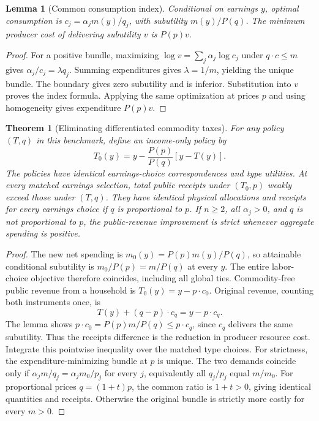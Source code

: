 \documentclass[11pt]{article}
\newtheorem{theorem}{Theorem}
\newtheorem{lemma}{Lemma}
\theoremstyle{definition}
\begin{document}
\begin{lemma}[Common consumption index]
Conditional on earnings $y$, optimal consumption is $c_j=\alpha_jm(y)/q_j$, with subutility $m(y)/P(q)$. The minimum producer cost of delivering subutility $v$ is $P(p)v$.
\end{lemma}
\begin{proof}
For a positive bundle, maximizing $\log v=\sum_j\alpha_j\log c_j$ under $q\cdot c\leq m$ gives $\alpha_j/c_j=\lambda q_j$. Summing expenditures gives $\lambda=1/m$, yielding the unique bundle. The boundary gives zero subutility and is inferior. Substitution into $v$ proves the index formula. Applying the same optimization at prices $p$ and using homogeneity gives expenditure $P(p)v$.
\end{proof}

\begin{theorem}[Eliminating differentiated commodity taxes]
For any policy $(T,q)$ in this benchmark, define an income-only policy by
\[
 T_0(y)=y-\frac{P(p)}{P(q)}[y-T(y)].
\]
The policies have identical earnings-choice correspondences and type utilities. At every matched earnings selection, total public receipts under $(T_0,p)$ weakly exceed those under $(T,q)$. They have identical physical allocations and receipts for every earnings choice if $q$ is proportional to $p$. If $n\geq2$, all $\alpha_j>0$, and $q$ is not proportional to $p$, the public-revenue improvement is strict whenever aggregate spending is positive.
\end{theorem}
\begin{proof}
The new net spending is $m_0(y)=P(p)m(y)/P(q)$, so attainable conditional subutility is $m_0/P(p)=m/P(q)$ at every $y$. The entire labor-choice objective therefore coincides, including all global ties. Commodity-free public revenue from a household is $T_0(y)=y-p\cdot c_0$. Original revenue, counting both instruments once, is
\[
 T(y)+(q-p)\cdot c_q=y-p\cdot c_q.
\]
The lemma shows $p\cdot c_0=P(p)m/P(q)\leq p\cdot c_q$, since $c_q$ delivers the same subutility. Thus the receipts difference is the reduction in producer resource cost. Integrate this pointwise inequality over the matched type choices.
For strictness, the expenditure-minimizing bundle at $p$ is unique. The two demands coincide only if $\alpha_jm/q_j=\alpha_jm_0/p_j$ for every $j$, equivalently all $q_j/p_j$ equal $m/m_0$. For proportional prices $q=(1+t)p$, the common ratio is $1+t>0$, giving identical quantities and receipts. Otherwise the original bundle is strictly more costly for every $m>0$.
\end{proof}
\end{document}
